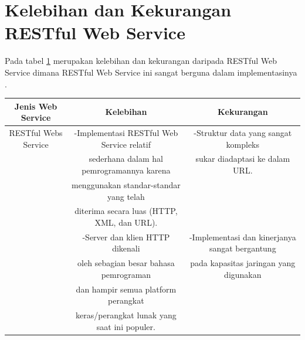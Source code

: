 \section{Kelebihan dan Kekurangan RESTful Web Service}
Pada tabel \ref{table:contoh} merupakan kelebihan dan kekurangan daripada RESTful Web Service dimana RESTful Web Service ini sangat berguna dalam implementasinya \cite{nugroho2012perbandingan}.
\begin{table}[h]
\begin{tabular}{|c|c|c|}
\hline
Jenis Web Service&Kelebihan&Kekurangan\\
\hline
RESTful Webs Service&-Implementasi RESTful Web Service relatif& -Struktur data yang sangat kompleks\\
&sederhana dalam hal pemrogramannya karena& sukar diadaptasi ke dalam URL.\\
&menggunakan standar-standar yang telah&\\
&diterima secara luas (HTTP, XML, dan URL).&\\
&-Server dan klien HTTP dikenali&-Implementasi dan kinerjanya sangat bergantung\\
&oleh sebagian besar bahasa pemrograman&pada kapasitas jaringan yang digunakan\\
&dan hampir semua platform perangkat&\\
&keras/perangkat lunak yang saat ini populer.&\\
\hline
\end{tabular}
\label{table:contoh}
\end{table}




